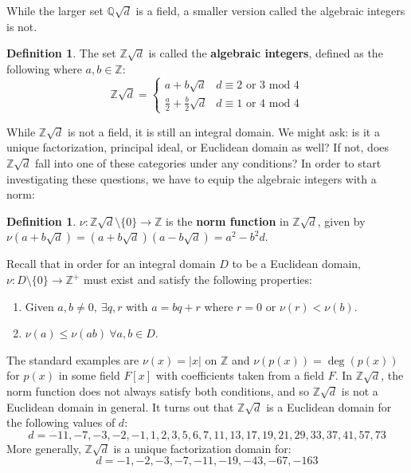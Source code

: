 \documentclass[11pt]{amsart}
\theoremstyle{definition}
\newtheorem{definition}[theorem]{Definition}
\newcommand{\integers}{\mathbb{Z}}
\newcommand{\qd}{\mathbb{Q}\sqrt{d}}
\newcommand{\zd}{\mathbb{Z}\sqrt{d}} %
\begin{document}
While the larger set $\qd$ is a field, a smaller version called the algebraic integers is not.
\begin{definition}
	The set $\zd$ is called the \textbf{algebraic integers}, defined as the following where $a, b \in \integers$:
	\[
		\zd = \begin{cases} 
			a + b\sqrt{d} & d \equiv 2 \text{ or } 3 \text{ mod 4} \\
			\frac{a}{2} + \frac{b}{2}\sqrt{d} & d \equiv 1 \text{ or } 4 \text{ mod 4}
   		\end{cases}
	\]
\end{definition}
While $\zd$ is not a field, it is still an integral domain. We might ask: is it a unique factorization, principal ideal, or Euclidean domain as well? If
not, does $\zd$ fall into one of these categories under any conditions? In order to start investigating these questions, we have to equip the
algebraic integers with a norm:
\begin{definition}
	$\nu: \zd \setminus \{ 0 \} \to \integers$ is the \textbf{norm function} in $\zd$, given by $\nu(a + b\sqrt{d}) = (a + b\sqrt{d})(a - b\sqrt{d})
	= a^2 - b^2d$.
\end{definition}
Recall that in order for an integral domain $D$ to be a Euclidean domain, $\nu: D \setminus \{ 0 \} \to \integers^{+}$ must exist and satisfy the
following properties:
\begin{enumerate}
	\item{Given $a, b \neq 0, \: \exists q, r$ with $a = bq + r$ where $r = 0$ or $\nu(r) < \nu(b)$.}
	\item{$\nu(a) \leq \nu(ab) \: \forall a, b \in D$.}
\end{enumerate}
The standard examples are $\nu(x) = | x |$ on $\integers$ and $\nu(p(x)) = \deg(p(x))$ for $p(x)$ in some field $F[x]$ with coefficients taken from
a field $F$. In $\zd$, the norm function does not always satisfy both conditions, and so $\zd$ is not a Euclidean domain in general. It turns out
that $\zd$ is a Euclidean domain for the following values of $d$:
\[ 
	d = -11, -7, -3, -2, -1, 1, 2, 3, 5, 6, 7, 11, 13, 17, 19, 21, 29, 33, 37, 41, 57, 73
\]
More generally, $\zd$ is a unique factorization domain for:
\[
	d = -1, -2, -3, -7, -11, -19, -43, -67, -163
\]
\end{document}
